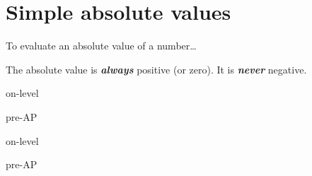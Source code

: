 

\section*{Simple absolute values}

\begin{myConceptSteps}{To evaluate an absolute value of a number\dots}
\end{myConceptSteps}

\begin{center}
    \begin{tcolorbox}[width=4in]
        The absolute value is {\bfseries\itshape always} positive (or zero).
        It is {\bfseries\itshape never} negative.
    \end{tcolorbox}
\end{center}



\begin{taggedblock}{on-level}
\end{taggedblock}
\begin{taggedblock}{pre-AP}
\end{taggedblock}

\begin{taggedblock}{on-level}
\end{taggedblock}
\begin{taggedblock}{pre-AP}
\end{taggedblock}


